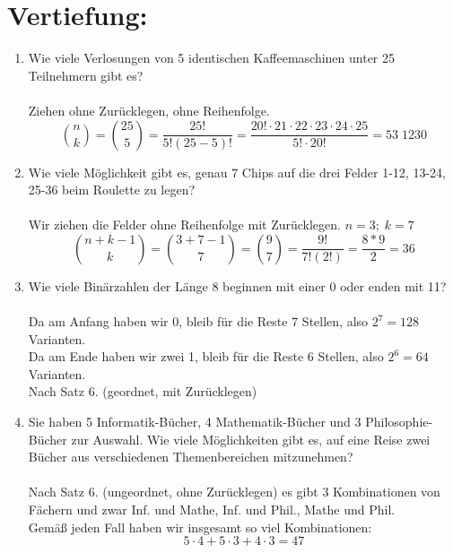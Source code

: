 



    \maketitle
    \section*{Vertiefung:}
    \begin{enumerate}[label=(\alph*)]
        \item  Wie viele Verlosungen von 5 identischen Kaffeemaschinen unter 25 Teilnehmern gibt es?\\\\
        Ziehen ohne Zurücklegen, ohne Reihenfolge.\\    
        $${n \choose k}= {25 \choose 5}= \frac{25!}{5!(25-5)!}= 
        \frac{20!\cdot 21 \cdot 22 \cdot 23 \cdot 24 \cdot 25}{5! \cdot 20!} = 53 \; 1230 $$
        
        \item Wie viele Möglichkeit gibt es, genau 7 Chips auf die drei Felder 1-12, 13-24, 25-36 
        beim Roulette zu legen?\\\\ 
        Wir ziehen die Felder ohne Reihenfolge mit Zur\"ucklegen.
        $n=3; \; k=7$ \\
        $$ \binom{n+k-1}{k}= \binom{3+7-1}{7}= \binom{9}{7}=
        \frac{9!}{7!(2!)}= \frac{8*9}{2}=36 $$

        \item Wie viele Binärzahlen der Länge 8 beginnen mit einer 0 oder enden mit 11?\\\\
        Da am Anfang haben wir 0, bleib f\"ur die Reste 7 Stellen, also $2^7 = 128$ Varianten.\\
        Da am Ende haben wir zwei 1, bleib f\"ur die Reste 6 Stellen, also $2^6 = 64$ Varianten.\\
        Nach Satz 6. (geordnet, mit Zur\"ucklegen)

        \item Sie haben 5 Informatik-Bücher, 4 Mathematik-Bücher und 3 Philosophie-Bücher zur
        Auswahl. Wie viele Möglichkeiten gibt es, auf eine Reise zwei Bücher aus verschiedenen
        Themenbereichen mitzunehmen?\\\\
        Nach Satz 6. (ungeordnet, ohne Zur\"ucklegen) es gibt 3 Kombinationen von F\"achern und zwar
        Inf. und Mathe, Inf. und Phil., Mathe und Phil.\\
        Gemäß jeden Fall haben wir insgesamt so viel Kombinationen:
        \[5 \cdot 4 + 5 \cdot 3 + 4 \cdot 3 = 47\]


\end{enumerate}
